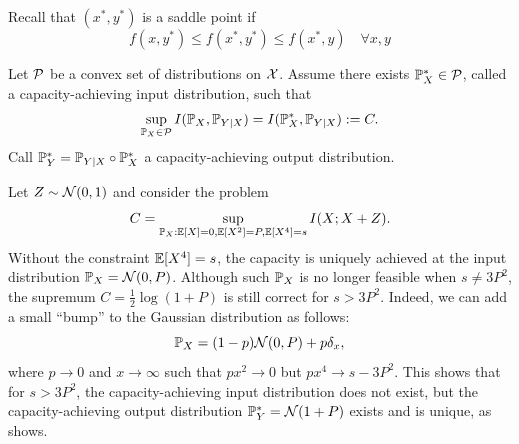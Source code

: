 Recall that $(x^*,y^*)$ is a saddle point if 
\[f(x,y^*)\leq f(x^*,y^*)\leq f(x^*,y)\quad \forall x,y\]



\begin{lemma}
    
\end{lemma}

\begin{assumption}\label{ass:existence-capacity-achieving-input-distribution}
    Let $\mathcal{P}$ be a convex set of distributions on $\mathcal{X}$.
    Assume there exists $\mathbb{P}_X^*\in\mathcal{P}$, called a capacity-achieving input distribution, such that
    \[\sup_{\mathbb{P}_X\in\mathcal{P}}I(\mathbb{P}_X,\mathbb{P}_{Y|X})=I(\mathbb{P}_X^*,\mathbb{P}_{Y|X}):=C.\]
    Call $\mathbb{P}_Y^*=\mathbb{P}_{Y|X}\circ\mathbb{P}_X^*$ a capacity-achieving output distribution.
\end{assumption}
\begin{example}
    Let $Z\sim\mathcal{N}(0,1)$ and consider the problem
    \[C=\sup_{\mathbb{P}_X:\mathbb{E}[X]=0,\mathbb{E}[X^2]=P,\mathbb{E}[X^4]=s}I(X;X+Z).\]
    Without the constraint $\mathbb{E}[X^4]=s$, the capacity is uniquely achieved at the input distribution $\mathbb{P}_X=\mathcal{N}(0,P)$.
    Although such $\mathbb{P}_X$ is no longer feasible when $s\neq 3P^2$, the supremum $C=\frac{1}{2}\log(1+P)$ is still correct for $s>3P^2$.
    Indeed, we can add a small ``bump'' to the Gaussian distribution as follows:
    \[\mathbb{P}_X=(1-p)\mathcal{N}(0,P)+p\delta_x,\]
    where $p\to 0$ and $x\to\infty$ such that $px^2\to 0$ but $px^4\to s-3P^2$.
    This shows that for $s>3P^2$, the capacity-achieving input distribution does not exist, but the capacity-achieving output distribution $\mathbb{P}_Y^*=\mathcal{N}(1+P)$ exists and is unique, as  shows.
\end{example}

